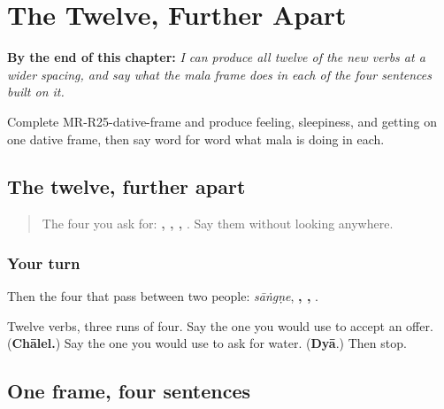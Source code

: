 
\chapter{The Twelve, Further Apart}
\label{ch:mr-twelve-verbs-r2}

\begin{chapteropening}
\textbf{By the end of this chapter:} \emph{I can produce all twelve of the new verbs at a wider spacing, and say what the mala frame does in each of the four sentences built on it.}

Complete MR-R25-dative-frame and produce feeling, sleepiness, and getting on one dative frame, then say word for word what mala is doing in each.
\end{chapteropening}

\section[\texorpdfstring{\mr{बारा} \mr{क्रियापदं} (bārā kriyāpadaṁ)}{बारा क्रियापदं (bārā kriyāpadaṁ)}]{The twelve, further apart}

\label{lesson:MR-R25-twelve-verbs}



\begin{quote}
The four you ask for: \textbf{, , , }. Say them without looking anywhere.
\end{quote}

\subsection*{Your turn}
Then the four that pass between two people: \emph{sāṅgṇe}, \textbf{, , }.

\begin{tcolorbox}[breakable,colback=teal!4,colframe=teal!35!black,title={Before you move on}]
Twelve verbs, three runs of four. Say the one you would use to accept an offer. (\textbf{Chālel.}) Say the one you would use to ask for water. (\textbf{Dyā}.) Then stop.
\end{tcolorbox}
\section[\texorpdfstring{\mr{मला} … (malā …)}{मला … (malā …)}]{One frame, four sentences}


